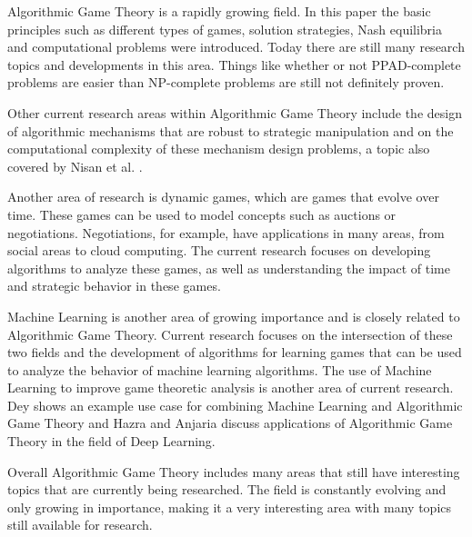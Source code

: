 Algorithmic Game Theory is a rapidly growing field. In this paper the basic principles such as different types of games, solution strategies, Nash equilibria and computational problems were introduced. Today there are still many research topics and developments in this area. Things like whether or not PPAD-complete problems are easier than NP-complete problems are still not definitely proven.

Other current research areas within Algorithmic Game Theory include the design of algorithmic mechanisms that are robust to strategic manipulation and on the computational complexity of these mechanism design problems, a topic also covered by Nisan et al. \autocite{agt}.

Another area of research is dynamic games, which are games that evolve over time. These games can be used to model concepts such as auctions or negotiations. Negotiations, for example, have applications in many areas, from social areas to cloud computing. The current research focuses on developing algorithms to analyze these games, as well as understanding the impact of time and strategic behavior in these games.

Machine Learning is another area of growing importance and is closely related to Algorithmic Game Theory. Current research focuses on the intersection of these two fields and the development of algorithms for learning games that can be used to analyze the behavior of machine learning algorithms. The use of Machine Learning to improve game theoretic analysis is another area of current research. Dey \autocite{MLAndAGT} shows an example use case for combining Machine Learning and Algorithmic Game Theory and Hazra and Anjaria \autocite{agtInDL} discuss applications of Algorithmic Game Theory in the field of Deep Learning.

Overall Algorithmic Game Theory includes many areas that still have interesting topics that are currently being researched. The field is constantly evolving and only growing in importance, making it a very interesting area with many topics still available for research.